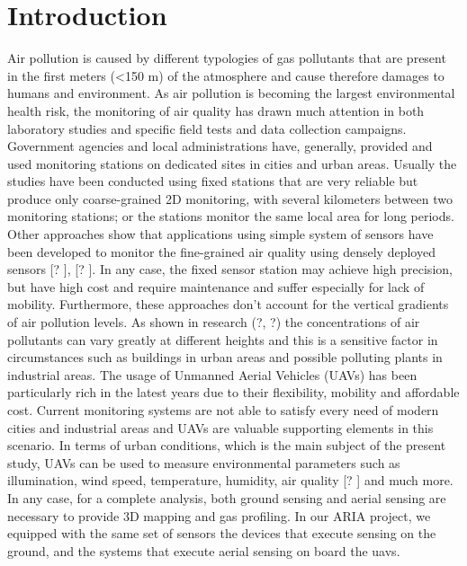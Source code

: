 \chapter{Introduction}
Air pollution is caused by different typologies of gas pollutants that are present in the first meters (<150 m) of the atmosphere and cause therefore damages to humans and environment. As air pollution is becoming the largest environmental health risk, the monitoring of air quality has drawn much attention in both laboratory studies and specific field tests and data collection campaigns. Government agencies and local administrations have, generally, provided and used monitoring stations on dedicated sites in cities and urban areas. Usually the studies have been conducted using fixed stations that are very reliable but produce only coarse-grained 2D monitoring, with several kilometers between two monitoring stations; or the stations monitor the same local area for long periods.
Other approaches show that applications using simple system of sensors have been developed to monitor the fine-grained air quality using densely deployed sensors [? ], [? ]. In any case, the fixed sensor station may achieve high precision, but have high cost and require maintenance and suffer especially for lack of mobility.
Furthermore, these approaches don't account for the vertical gradients of air pollution levels. As shown in research (?, ?) the concentrations of air pollutants can vary greatly at different heights and this is a sensitive factor in circumstances such as buildings in urban areas and possible polluting plants in industrial areas.
The usage of Unmanned Aerial Vehicles (UAVs) has been particularly rich in the latest years due to their flexibility, mobility and affordable cost. Current monitoring systems are not able to satisfy every need of modern cities and industrial areas and UAVs are valuable supporting elements in this scenario.
In terms of urban conditions, which is the main subject of the present study, UAVs can be used to measure environmental parameters such as illumination, wind speed, temperature, humidity, air quality [? ] and much more. In any case, for a complete analysis, both ground sensing and aerial sensing are necessary to provide 3D mapping and gas profiling. In our ARIA project, we equipped with the same set of sensors the devices that execute sensing on the ground, and the systems that execute aerial sensing on board the \gls{uavs}.
